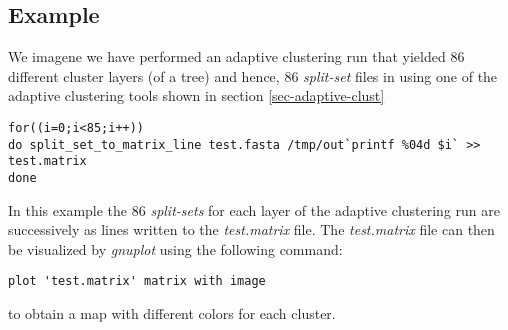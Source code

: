 \subsection{Example}
We imagene we have performed an adaptive clustering run that
yielded 86 different
cluster layers (of a tree) and hence, 86 \emph{split-set} files in using
one of the adaptive clustering tools shown in section \ref{sec-adaptive-clust}
\begin{lstlisting}
for((i=0;i<85;i++))
do split_set_to_matrix_line test.fasta /tmp/out`printf %04d $i` >> test.matrix
done
\end{lstlisting}
In this example the 86 \emph{split-sets} for each layer of the
adaptive clustering run are successively as lines written to the
\emph{test.matrix} file.
The \emph{test.matrix} file can then be visualized by \emph{gnuplot} using
the following command:
\begin{lstlisting}
plot 'test.matrix' matrix with image
\end{lstlisting}
to obtain a map with different colors for each cluster. 
  
